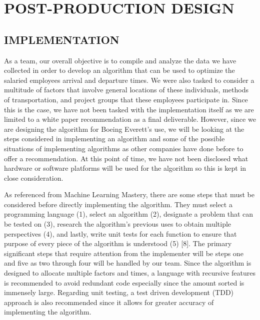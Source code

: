 \documentclass[a4,draftclsnofoot,onecolumn,margin=0.75,10pt]{IEEEtran}
\begin{document}

\clearpage\section[POST-PRODUCTION DESIGN]{\rmfamily\color{black}
POST-PRODUCTION DESIGN}

\subsection[IMPLEMENTATION]{\rmfamily\color{black}
IMPLEMENTATION}
{\color{black}
   As a team, our overall objective is to compile and analyze the data we have collected in order to develop an algorithm that can be used to optimize the salaried employees arrival and departure times. We were also tasked to consider a multitude of factors that involve general locations of these individuals, methods of transportation, and project groups that these employees participate in. Since this is the case, we have not been tasked with the implementation itself as we are limited to a white paper recommendation as a final deliverable. However, since we are designing the algorithm for Boeing Everett's use, we will be looking at the steps considered in implementing an algorithm and some of the possible situations of implementing algorithms as other companies have done before to offer a recommendation. At this point of time, we have not been disclosed what hardware or software platforms will be used for the algorithm so this is kept in close consideration. 
   
   As referenced from Machine Learning Mastery, there are some steps that must be considered before directly implementing the algorithm. They must select a programming language (1), select an algorithm (2), designate a problem that can be tested on (3), research the algorithm's previous uses to obtain multiple perspectives (4), and lastly, write unit tests for each function to ensure that purpose of every piece of the algorithm is understood (5) [8]. The primary significant steps that require attention from the implementer will be steps one and five as two through four will be handled by our team. Since the algorithm is designed to allocate multiple factors and times, a language with recursive features is recommended to avoid redundant code especially since the amount sorted is immensely large. Regarding unit testing, a test driven development (TDD) approach is also recommended since it allows for greater accuracy of implementing the algorithm.
  
}
\end{document}
